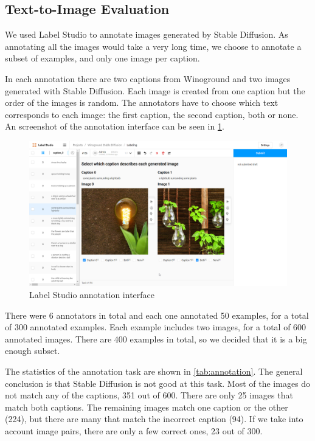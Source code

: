 \subsection{Text-to-Image Evaluation}

We used Label Studio \cite{labelstudio} to annotate images generated by Stable Diffusion. As annotating all the images would take a very long time, we choose to annotate a subset of examples, and only one image per caption. 

In each annotation there are two captions from Winoground and two images generated with Stable Diffusion. Each image is created from one caption but the order of the images is random. The annotators have to choose which text corresponds to each image: the first caption, the second caption, both or none. An screenshot of the annotation interface can be seen in \cref{fig:label-studio-annotation}.

\begin{figure}[ht]
    \centering
    \includegraphics[width=\linewidth]{images/annotation/label-studio-annotation.png}
    \caption{Label Studio annotation interface}
    \label{fig:label-studio-annotation}
\end{figure}

There were 6 annotators in total and each one annotated 50 examples, for a total of 300 annotated examples. Each example includes two images, for a total of 600 annotated images. There are 400 examples in total, so we decided that it is a big enough subset.

The statistics of the annotation task are shown in \cref{tab:annotation}. The general conclusion is that Stable Diffusion is not good at this task. Most of the images do not match any of the captions, 351 out of 600. There are only 25 images that match both captions. The remaining images match one caption or the other (224), but there are many that match the incorrect caption (94). If we take into account image pairs, there are only a few correct ones, 23 out of 300.

